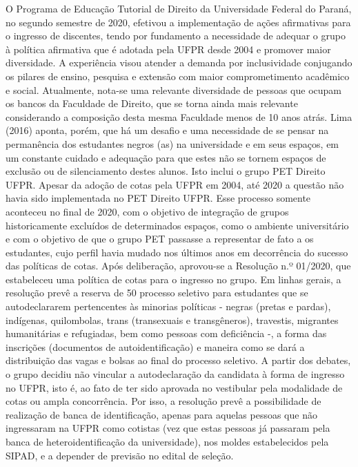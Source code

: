 O Programa de Educação Tutorial de Direito da Universidade Federal do Paraná, no
segundo semestre de 2020, efetivou a implementação de ações afirmativas para o ingresso de
discentes, tendo por fundamento a necessidade de adequar o grupo à política afirmativa que é
adotada pela UFPR desde 2004 e promover maior diversidade. A experiência visou atender a
demanda por inclusividade conjugando os pilares de ensino, pesquisa e extensão com maior
comprometimento acadêmico e social.
Atualmente, nota-se uma relevante diversidade de pessoas que ocupam os bancos da
Faculdade de Direito, que se torna ainda mais relevante considerando a composição desta mesma
Faculdade menos de 10 anos atrás. Lima (2016) aponta, porém, que há um desafio e uma
necessidade de se pensar na permanência dos estudantes negros (as) na universidade e em seus
espaços, em um constante cuidado e adequação para que estes não se tornem espaços de
exclusão ou de silenciamento destes alunos. Isto inclui o grupo PET Direito UFPR.
Apesar da adoção de cotas pela UFPR em 2004, até 2020 a questão não havia sido
implementada no PET Direito UFPR. Esse processo somente aconteceu no final de 2020, com o
objetivo de integração de grupos historicamente excluídos de determinados espaços, como o
ambiente universitário e com o objetivo de que o grupo PET passasse a representar de fato a os
estudantes, cujo perfil havia mudado nos últimos anos em decorrência do sucesso das políticas
de cotas. Após deliberação, aprovou-se a Resolução n.º 01/2020, que estabeleceu uma política
de cotas para o ingresso no grupo.
Em linhas gerais, a resolução prevê a reserva de 50%
processo seletivo para estudantes que se autodeclararem pertencentes às minorias políticas -
negras (pretas e pardas), indígenas, quilombolas, trans (transexuais e transgêneros), travestis,
migrantes humanitárias e refugiadas, bem como pessoas com deficiência -, a forma das
inscrições (documentos de autoidentificação) e maneira como se dará a distribuição das vagas e
bolsas ao final do processo seletivo.
A partir dos debates, o grupo decidiu não vincular a autodeclaração da candidata à forma
de ingresso no UFPR, isto é, ao fato de ter sido aprovada no vestibular pela modalidade de cotas
ou ampla concorrência. Por isso, a resolução prevê a possibilidade de realização de banca de
identificação, apenas para aquelas pessoas que não ingressaram na UFPR como cotistas (vez que
estas pessoas já passaram pela banca de heteroidentificação da universidade), nos moldes
estabelecidos pela SIPAD, e a depender de previsão no edital de seleção.
